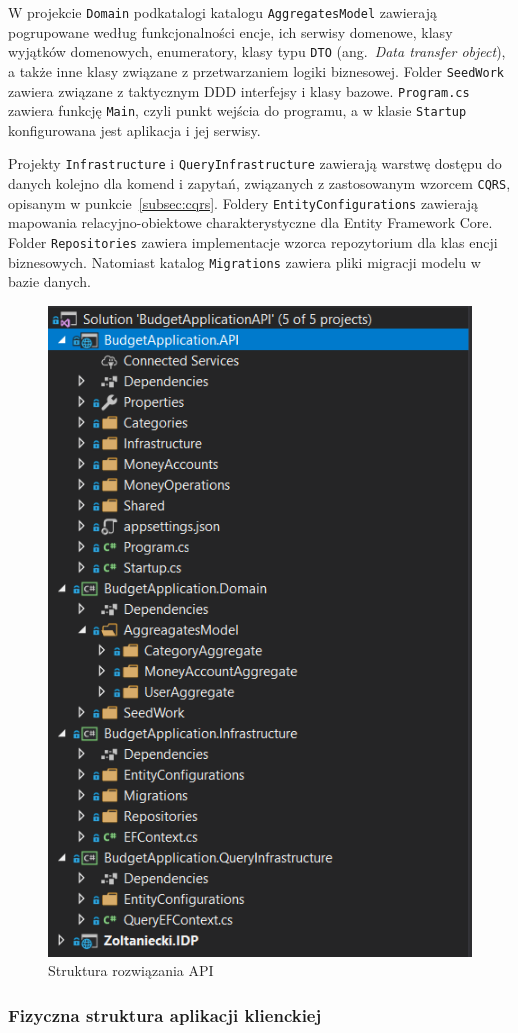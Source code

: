 W projekcie \texttt{Domain} podkatalogi katalogu \texttt{AggregatesModel} zawierają pogrupowane według funkcjonalności encje, ich serwisy domenowe, klasy wyjątków domenowych, enumeratory, klasy typu \texttt{DTO} (ang.~\emph{Data transfer object}), a także inne klasy związane z przetwarzaniem logiki biznesowej. Folder \texttt{SeedWork} zawiera związane z taktycznym DDD interfejsy i klasy bazowe. \texttt{Program.cs} zawiera funkcję \texttt{Main}, czyli punkt wejścia do programu, a w klasie \texttt{Startup} konfigurowana jest aplikacja i jej serwisy.

Projekty \texttt{Infrastructure} i \texttt{QueryInfrastructure} zawierają warstwę dostępu do danych kolejno dla komend i zapytań, związanych z zastosowanym wzorcem \texttt{CQRS}, opisanym w punkcie~\ref{subsec:cqrs}. Foldery \texttt{EntityConfigurations} zawierają mapowania relacyjno-obiektowe charakterystyczne dla Entity Framework Core. Folder \texttt{Repositories} zawiera implementacje wzorca repozytorium dla klas encji biznesowych. Natomiast katalog \texttt{Migrations} zawiera pliki migracji modelu w bazie danych.

\begin{figure}[t]
	\centering
	\includegraphics[width=.5\linewidth]{rys04/struktura-fizyczna-api-2.PNG}
	\caption{Struktura rozwiązania API}
	\label{fig:fiz-api-2}
\end{figure}

\subsubsection{Fizyczna struktura aplikacji klienckiej}

